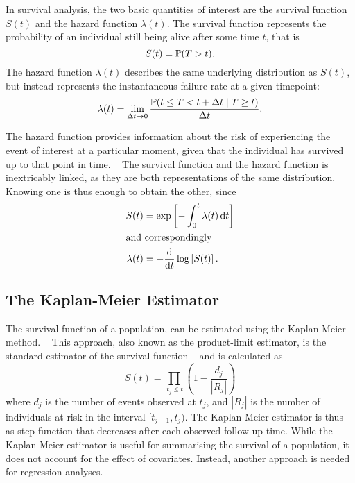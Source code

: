 In survival analysis, the two basic quantities of interest are
the survival function \(S(t)\) and the hazard function \(\lambda(t)\).
The survival function represents
the probability of an
individual still being alive 
after some time \(t\), that is
%
\begin{equation}
    S(t) = \operatorname{\mathbb{P}} (T > t).
\end{equation}
%
The hazard function \(\lambda(t)\) describes 
the same underlying distribution as \(S(t)\), 
but instead represents the instantaneous failure rate 
at a given timepoint:
%
\begin{equation}
    \label{eq:hazard-function}
    \lambda(t) = \lim_{\Delta t \to 0} 
        \frac{\PR (t \leq T < t + \Delta t \mid T \geq t)}{\Delta t}.
\end{equation}

The hazard function provides information 
about the risk of experiencing the event of interest at a particular moment,
given that the individual has survived up to that point in time.
~\autocite{kleinSurvival2003}
The survival function and the hazard function is inextricably linked,
as they are both representations of the same distribution.
Knowing one is thus enough to obtain the other, since
%
\begin{align}
    S(t) &= \exp \left[ - \int_{0}^{t}{\lambda(t) \, \mathrm{d} t} \right] \\
    \intertext{and correspondingly}
    \lambda(t) &= - \frac{\mathrm{d} }{\mathrm{d} t} \log \left[S(t)\right].
\end{align}
%

\subsection{The Kaplan-Meier Estimator}

The survival function of a population,
can be estimated using the Kaplan-Meier method. 
~\autocite{kaplan1958nonparametric}
This approach, also known as the product-limit estimator,
is the standard estimator of the survival function
~\autocite{kleinSurvival2003}
and is calculated as 
%
\begin{equation}
    \widehat{S} (t) = \prod_{\, t_j \leq t} \left(
        1 - \frac{d_j}{|R_j|}
    \right)
\end{equation}
%
where \(d_j\) is the number of events observed at \(t_j\),
and \(|R_j|\) is the number of individuals at risk in the interval 
\([t_{j-1}, t_j)\).
The Kaplan-Meier estimator is thus as step-function that decreases
after each observed follow-up time.
While the Kaplan-Meier estimator is useful 
for summarising the survival of a population, 
it does not account for the effect of covariates.
Instead, another approach is needed for regression analyses.

